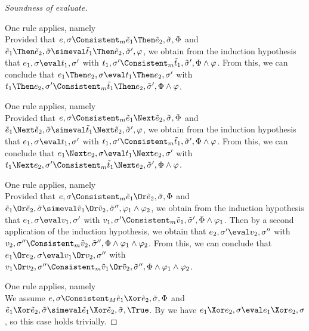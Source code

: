\begin{proof}[Soundness of evaluate]
{    }

    {One rule applies, namely \\
    Provided that $e,\sigma\Consistent_m \tilde{e}_1\Then \tilde{e}_2,\tilde{\sigma},\Phi$ and $\tilde{e}_1\Then \tilde{e}_2,\tilde{\sigma}\simeval\tilde{t}_1\Then \tilde{e}_2,\tilde{\sigma}',\phi$,
    we obtain from the induction hypothesis that $e_1,\sigma\eval t_1,\sigma'$ with $t_1,\sigma'\Consistent_m \tilde{t}_1,\tilde{\sigma}',\Phi\land\phi$.
    From this, we can conclude that $e_1\Then e_2,\sigma\eval t_1\Then e_2,\sigma'$ with $t_1\Then e_2,\sigma'\Consistent_m \tilde{t}_1\Then e_2,\tilde{\sigma}',\Phi\land\phi$.

    }

    {One rule applies, namely \\
    Provided that $e,\sigma\Consistent_m \tilde{e}_1\Next \tilde{e}_2,\tilde{\sigma},\Phi$ and $\tilde{e}_1\Next \tilde{e}_2,\tilde{\sigma}\simeval\tilde{t}_1\Next \tilde{e}_2,\tilde{\sigma}',\phi$,
    we obtain from the induction hypothesis that $e_1,\sigma\eval t_1,\sigma'$ with $t_1,\sigma'\Consistent_m \tilde{t}_1,\tilde{\sigma}',\Phi\land\phi$.
    From this, we can conclude that $e_1\Next e_2,\sigma\eval t_1\Next e_2,\sigma'$ with $t_1\Next e_2,\sigma'\Consistent_m \tilde{t}_1\Next e_2,\tilde{\sigma}',\Phi\land\phi$.

    }

    {One rule applies, namely \\
    Provided that $e,\sigma\Consistent_m\tilde{e}_1 \Or \tilde{e}_2,\tilde{\sigma},\Phi$ and $\tilde{e}_1 \Or \tilde{e}_2,\tilde{\sigma}\simeval\tilde{v}_1\Or \tilde{v}_2,\tilde{\sigma}'',\phi_1\land\phi_2$,
    we obtain from the induction hypothesis that $e_1,\sigma\eval v_1,\sigma'$ with $v_1,\sigma'\Consistent_m\tilde{v}_1,\tilde{\sigma}',\Phi\land\phi_1$.
    Then by a second application of the induction hypothesis, we obtain that $e_2,\sigma'\eval v_2,\sigma''$ with $v_2,\sigma''\Consistent_m\tilde{v}_2,\tilde{\sigma}'',\Phi\land\phi_1\land\phi_2$.
    From this, we can conclude that $e_1 \Or e_2,\sigma\eval v_1 \Or v_2,\sigma''$ with $v_1 \Or v_2,\sigma''\Consistent_m\tilde{v}_1 \Or \tilde{v}_2,\tilde{\sigma}'',\Phi\land\phi_1\land\phi_2$.

    }

    {  One rule applies, namely \\
    We assume $e,\sigma\Consistent_M\tilde{e}_1\Xor \tilde{e}_2,\tilde{\sigma},\Phi$ and $\tilde{e}_1\Xor \tilde{e}_2,\tilde{\sigma}\simeval\tilde{e}_1\Xor \tilde{e}_2,\tilde{\sigma},\True$.
    By  we have $e_1\Xor e_2,\sigma\eval e_1\Xor e_2,\sigma$, so this case holds trivially.

}
\end{proof}
